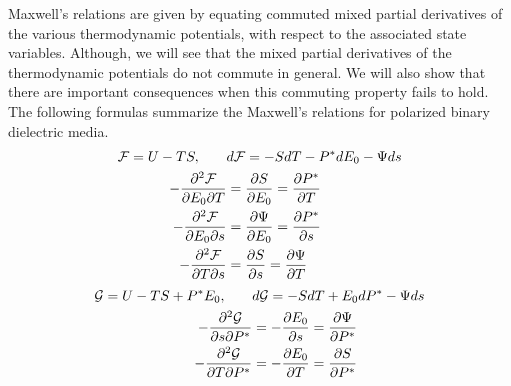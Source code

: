 \documentclass[english,12pt]{ttuthes}
\newcommand{\Fc}{\mathcal{F}}
\begin{document}
Maxwell's relations are given by equating commuted mixed partial
derivatives of the various thermodynamic potentials, with respect to
the associated state variables. Although, we will see that the mixed
partial derivatives of the thermodynamic potentials do not commute in
general. We will also show that there are important consequences when
this commuting property fails to hold. The following formulas
summarize the Maxwell's relations for polarized binary dielectric media.  
%
\begin{align}\label{eq:Helmholtz_Free_Energy_Maxwell's_Relations}
  \Fc=U-TS, \qquad &d\Fc=-SdT-P^*dE_0-\Psi ds\\
  \quad -\frac{\partial^2\Fc}{\partial E_0\partial T}&=\frac{\partial S}{\partial E_0}
                                     =\frac{\partial P^*}{\partial T}
                                     \notag\\
  \quad -\frac{\partial^2\Fc}{\partial E_0\partial s}&=\frac{\partial\Psi}{\partial E_0}
                                     =\frac{\partial P^*}{\partial s}
                                     \notag\\
  \quad -\frac{\partial^2\Fc}{\partial T\partial s}&=\frac{\partial S}{\partial s}
                                     =\frac{\partial\Psi}{\partial T}
                                     \notag 
\end{align}  
%
%
\begin{align}\label{eq:Gibbs_Free_Energy_Maxwell's_Relations}  
  \mathcal{G}=U-TS+P^*E_0, \qquad &d\mathcal{G}=-SdT+E_0dP^*-\Psi ds \\
  \quad -\frac{\partial^2\mathcal{G}}{\partial s\partial P^*}&=-\frac{\partial E_0}{\partial s}
                           =\frac{\partial\Psi}{\partial P^*}
                           \notag\\
  \quad -\frac{\partial^2\mathcal{G}}{\partial T\partial P^*}&=-\frac{\partial E_0}{\partial T}
                           =\frac{\partial S}{\partial P^*}
                           \notag
\end{align}  
%
\end{document}
